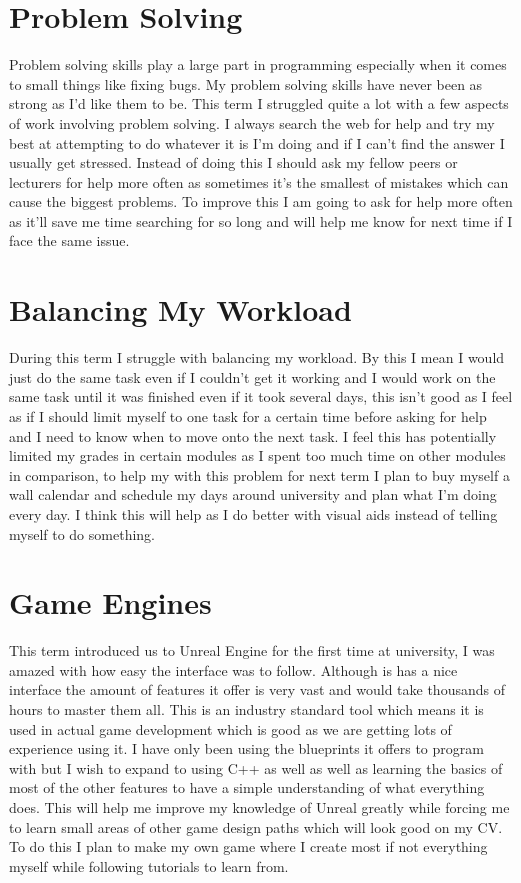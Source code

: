 \documentclass{scrartcl}
\begin{document}
\section{Problem Solving}
Problem solving skills play a large part in programming especially when it comes to small things like fixing bugs. My problem solving skills have never been as strong as I'd like them to be. This term I struggled quite a lot with a few aspects of work involving problem solving. I always search the web for help and try my best at attempting to do whatever it is I'm doing and if I can't find the answer I usually get stressed. Instead of doing this I should ask my fellow peers or lecturers for help more often as sometimes it's the smallest of mistakes which can cause the biggest problems. To improve this I am going to ask for help more often as it'll save me time searching for so long and will help me know for next time if I face the same issue.

\section{Balancing My Workload}
During this term I struggle with balancing my workload. By this I mean I would just do the same task even if I couldn't get it working and I would work on the same task until it was finished even if it took several days, this isn't good as I feel as if I should limit myself to one task for a certain time before asking for help and I need to know when to move onto the next task. I feel this has potentially limited my grades in certain modules as I spent too much time on other modules in comparison, to help my with this problem for next term I plan to buy myself a wall calendar and schedule my days around university and plan what I'm doing every day. I think this will help as I do better with visual aids instead of telling myself to do something.


\section{Game Engines}
This term introduced us to Unreal Engine for the first time at university, I was amazed with how easy the interface was to follow. Although is has a nice interface the amount of features it offer is very vast and would take thousands of hours to master them all. This is an industry standard tool which means it is used in actual game development which is good as we are getting lots of experience using it. I have only been using the blueprints it offers to program with but I wish to expand to using C++ as well as well as learning the basics of most of the other features to have a simple understanding of what everything does. This will help me improve my knowledge of Unreal greatly while forcing me to learn small areas of other game design paths which will look good on my CV. To do this I plan to make my own game where I create most if not everything myself while following tutorials to learn from.
\end{document}
